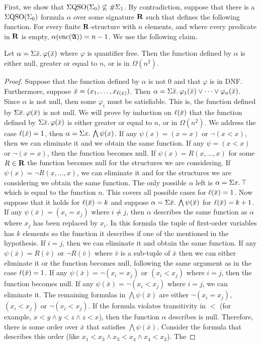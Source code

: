 \vspace{1em}
First, we show that $\Sigma{\rm QSO}(\Sigma_{0}) \not\subseteq \#\Sigma_{1}$. By contradiction, suppose that there is a $\Sigma{\rm QSO}(\Sigma_{0})$ formula $\alpha$ over some signature $\mathbf{R}$ such that defines the following function. For every finite $\mathbf{R}$-structure with $n$ elements, and where every predicate in $\mathbf{R}$ is empty, $\alpha({\rm enc}(\mathfrak{A})) = n - 1$. We use the following claim.
\begin{claim}
Let $\alpha = \Sigma{\bar{x}}.\,\varphi(\bar{x})$	where $\varphi$ is quantifier free. Then the function defined by $\alpha$ is either null, greater or equal to $n$, or is in $\Omega(n^2)$.
\end{claim}
\begin{proof}
Suppose that the function defined by $\alpha$ is not $0$ and that $\varphi$ is in DNF. Furthermore, suppose $\bar{x} = (x_1,\ldots,x_{\ell(\bar{x})})$. Then $\alpha = \Sigma{\bar{x}}.\, \varphi_1(\bar{x}) \vee \cdots \vee \varphi_n(\bar{x})$. Since $\alpha$ is not null, then some $\varphi_i$ must be satisfiable. This is, the function defined by $\Sigma{\bar{x}}.\,\varphi(\bar{x})$ is not null. We will prove by induction on $\ell(\bar{x})$ that the function defined by $\Sigma{\bar{x}}.\,\varphi(\bar{x})$ is either greater or equal to $n$, or in $\Omega(n^2)$. We address the case $\ell(\bar{x})= 1$, then $\alpha = \Sigma{x}.\,\bigwedge\psi(x)$. If any $\psi(x) = (x = x)$ or $\neg(x < x)$, then we can eliminate it and we obtain the same function. If any $\psi = (x < x)$ or $\neg(x=x)$, then the function becomes null. If $\psi(x) = R(x,\ldots,x)$ for some $R\in\mathbf{R}$ the function becomes null for the structures we are considering. If $\psi(x) = \neg R(x,\ldots,x)$, we can eliminate it and for the structures we are considering we obtain the same function. The only possible $\alpha$ left is $\alpha = \Sigma{x}.\,\top$ which is equal to the function $n$. This covers all possible cases for $\ell(\bar{x}) = 1$. Now suppose that it holds for $\ell(\bar{x}) = k$ and suppose $\alpha = \Sigma{\bar{x}}.\,\bigwedge\psi(\bar{x})$ for $\ell(\bar{x}) = k+1$. If any $\psi(\bar{x}) = (x_i = x_j)$ where $i \neq j$, then $\alpha$ describes the same function as $\alpha$ where $x_j$ has been replaced by $x_i$. In this formula the tuple of first-order variables has $k$ elements so the function it describes if one of the mentioned in the hypothesis. If $i = j$, then we can eliminate it and obtain the same function. If any $\psi(\bar{x}) = R(\bar{v})$ or $\neg R(\bar{v})$ where $\bar{v}$ is a sub-tuple of $\bar{x}$ then we can either eliminate it or the function becomes null, following the same argument as in the case $\ell(\bar{x}) = 1$. If any $\psi(\bar{x}) = \neg(x_i = x_j)$ or $(x_i < x_j)$ where $i = j$, then the function becomes null. If any $\psi(\bar{x}) = \neg(x_i < x_j)$ where $i = j$, we can eliminate it. The remaining formulas in $\bigwedge\psi(\bar{x})$ are either $\neg(x_i = x_j)$, $(x_i<x_j)$ or $\neg(x_i<x_j)$. If the formula violates transitivity in $<$ (for example, $x < y \wedge y < z \wedge z < x$), then the function $\alpha$ describes is null. Therefore, there is some order over $\bar{x}$ that satisfies $\bigwedge\psi(\bar{x})$. Consider the formula that describes this order (like $x_1 < x_3 \wedge x_3 < x_4 \wedge x_4 < x_2$). The 
\end{proof}
